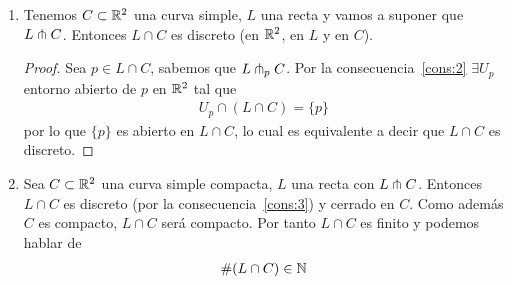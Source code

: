 \begin{observacion}
\begin{enumerate}
        \item\label{cons:3} Tenemos $C\subset \mathbb{R}^2$ una curva simple, $L$ una recta y vamos a suponer que $L \pitchfork C$. Entonces $L\cap C$ es discreto (en $\mathbb{R}^2$, en $L$ y en $C$).
        \begin{proof}
            Sea $p\in L\cap C$, sabemos que $L\pitchfork_p C$. Por la consecuencia~\ref{cons:2} $\exists U_p$ entorno abierto de $p$ en $\mathbb{R}^2$ tal que 
            \begin{gather*}
                U_p \cap (L\cap C) = \{p\}
            \end{gather*}
            por lo que $\{p\}$ es abierto en $L\cap C$, lo cual es equivalente a decir que $L\cap C$ es discreto.
        \end{proof}
        \item\label{cons:4} Sea $C\subset \mathbb{R}^2$ una curva simple compacta, $L$ una recta con $L\pitchfork C$. Entonces $L\cap C$ es discreto (por la consecuencia~\ref{cons:3}) y cerrado en $C$. Como además $C$ es compacto, $L\cap C$ será compacto. Por tanto $L\cap C$ es finito y podemos hablar de
        \begin{gather*}
            \# (L\cap C)\in \mathbb{N}
        \end{gather*}
    \end{enumerate}
\end{observacion}

